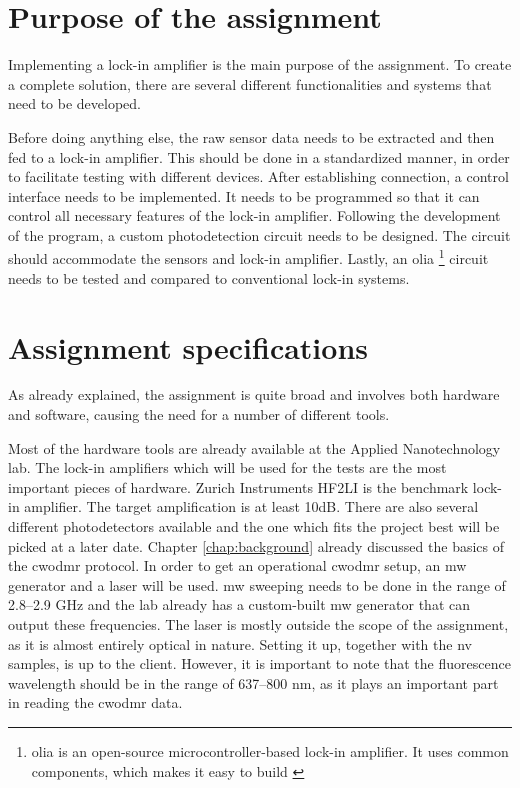 \section{Purpose of the assignment}\label{purpose}
Implementing a lock-in amplifier is the main purpose of the assignment. To create a complete solution, there are several different functionalities and systems that need to be developed. 

Before doing anything else, the raw sensor data needs to be extracted and then fed to a lock-in amplifier. This should be done in a standardized manner, in order to facilitate testing with different devices. After establishing connection, a control interface needs to be implemented. It needs to be programmed so that it can control all necessary features of the lock-in amplifier. Following the development of the program, a custom photodetection circuit needs to be designed. The circuit should accommodate the sensors and lock-in amplifier. Lastly, an \gls{olia} \footnote{\gls{olia} is an open-source microcontroller-based lock-in amplifier. It uses common components, which makes it easy to build \cite{harvie2023olia}} circuit needs to be tested and compared to conventional lock-in systems. 


\section{Assignment specifications}\label{specifications}
As already explained, the assignment is quite broad and involves both hardware and software, causing the need for a number of different tools. 

Most of the hardware tools are already available at the Applied Nanotechnology lab. The lock-in amplifiers which will be used for the tests are the most important pieces of hardware. Zurich Instruments HF2LI is the benchmark lock-in amplifier. The target amplification is at least 10dB. There are also several different photodetectors available and the one which fits the project best will be picked at a later date. Chapter \ref{chap:background} already discussed the basics of the \gls{cwodmr} protocol. In order to get an operational \gls{cwodmr} setup, an \gls{mw} generator and a laser will be used. \gls{mw} sweeping needs to be done in the range of \numrange{2,8}{2,9} \unit{\giga\hertz} and the lab already has a custom-built \gls{mw} generator that can output these frequencies. The laser is mostly outside the scope of the assignment, as it is almost entirely optical in nature. Setting it up, together with the \gls{nv} samples, is up to the client. However, it is important to note that the fluorescence wavelength should be in the range of \numrange{637}{800} \unit{\nano\meter}, as it plays an important part in reading the \gls{cwodmr} data.
	
